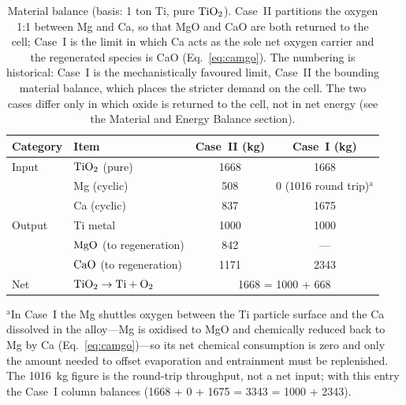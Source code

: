 \documentclass[pdflatex,sn-basic,Numbered]{sn-jnl}
\begin{document}
\begin{table}[!htbp]
\centering
\footnotesize
\caption{Material balance (basis: 1 ton Ti, pure $\ce{TiO2}$). Case~II partitions the oxygen 1:1 between Mg and Ca, so that MgO and CaO are both returned to the cell; Case~I is the limit in which Ca acts as the sole net oxygen carrier and the regenerated species is CaO (Eq.~\ref{eq:camgo}). The numbering is historical: Case~I is the mechanistically favoured limit, Case~II the bounding material balance, which places the stricter demand on the cell. The two cases differ only in which oxide is returned to the cell, not in net energy (see the Material and Energy Balance section).}
\label{tab:mbalance}
\begin{tabular}{llcc}
\toprule
Category & Item & Case~II (kg) & Case~I (kg) \\
\midrule
Input & $\ce{TiO2}$ (pure) & 1668 & 1668 \\
 & Mg (cyclic) & 508 & 0 (1016 round trip)$^{\mathrm{a}}$ \\
 & Ca (cyclic) & 837 & 1675 \\
\midrule
Output & Ti metal & 1000 & 1000 \\
 & $\ce{MgO}$ (to regeneration) & 842 & --- \\
 & $\ce{CaO}$ (to regeneration) & 1171 & 2343 \\
\midrule
Net & $\ce{TiO2} \to \ce{Ti} + \ce{O2}$ & \multicolumn{2}{c}{1668 = 1000 + 668} \\
\bottomrule
\end{tabular}

\par\footnotesize $^{\mathrm{a}}$In Case~I the Mg shuttles oxygen between the Ti particle surface and the Ca dissolved in the alloy---Mg is oxidised to MgO and chemically reduced back to Mg by Ca (Eq.~\ref{eq:camgo})---so its net chemical consumption is zero and only the amount needed to offset evaporation and entrainment must be replenished. The 1016~kg figure is the round-trip throughput, not a net input; with this entry the Case~I column balances (1668 + 0 + 1675 = 3343 = 1000 + 2343).
\end{table}
\end{document}
